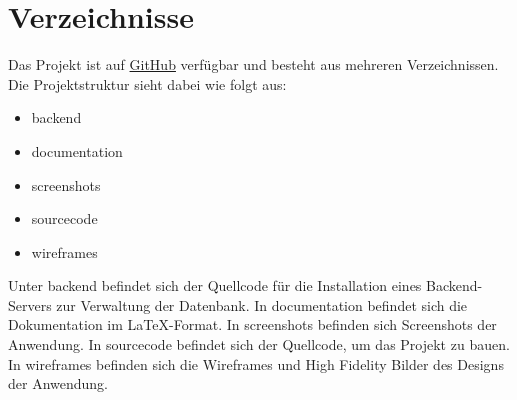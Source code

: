 
\chapter{Verzeichnisse}

Das Projekt ist auf \href{https://github.com/calvinrbnspiess/mobile-computing-payment-app}{GitHub} verfügbar und besteht aus mehreren Verzeichnissen.
Die Projektstruktur sieht dabei wie folgt aus:

\begin{itemize}
    \item backend
    \item documentation
    \item screenshots
    \item sourcecode
    \item wireframes
\end{itemize}

Unter \glqq backend\grqq{} befindet sich der Quellcode für die Installation eines Backend-Servers zur Verwaltung der Datenbank.
In \glqq documentation\grqq{} befindet sich die Dokumentation im LaTeX-Format.
In \glqq screenshots\grqq{} befinden sich Screenshots der Anwendung.
In \glqq sourcecode\grqq{} befindet sich der Quellcode, um das Projekt zu bauen.
In \glqq wireframes\grqq{} befinden sich die Wireframes und High Fidelity Bilder des Designs der Anwendung.
